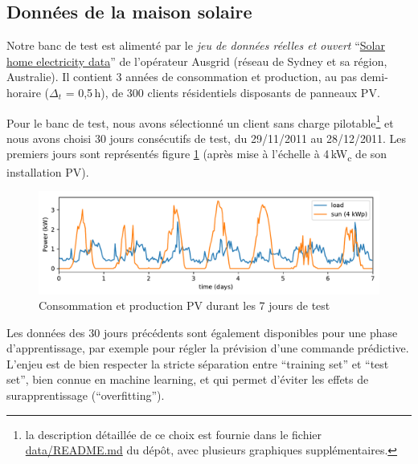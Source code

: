 \documentclass[a4paper,10pt,twocolumn]{article}
\newcommand\sub[1]{\textsubscript{#1}}
\begin{document}
\subsection{Données de la maison solaire}
\label{ss:sol_data}

Notre banc de test est alimenté par le \emph{jeu de données réelles et ouvert} ``\href{https://www.ausgrid.com.au/Common/About-us/Corporate-information/Data-to-share/Solar-home-electricity-data.aspx}{Solar home electricity data}''
de l'opérateur Ausgrid (réseau de Sydney et sa région, Australie).
Il contient 3 années de consommation et production, au pas demi-horaire ($\Delta_t$ = 0,5\,h),
de 300 clients résidentiels disposants de panneaux PV.

Pour le banc de test, nous avons sélectionné un client sans charge pilotable\footnote{
  la description détaillée de ce choix est fournie dans le fichier \href{https://github.com/pierre-haessig/solarhome-control-bench/blob/master/data/README.md}{data/README.md} du dépôt, avec plusieurs graphiques supplémentaires.}
et nous avons choisi 30 jours consécutifs de test, du 29/11/2011 au 28/12/2011.
Les premiers jours sont représentés figure \ref{fig:testdata}
(après mise à l'échelle à 4\,kW\sub{c} de son installation PV).

\begin{figure}[!ht]
        \begin{center}
                \includegraphics[width=1\columnwidth]{figures/data_week_2011-11-29.pdf}
        \end{center}

        \caption{Consommation et production PV durant les 7 jours de test
        }
        \label{fig:testdata}
\end{figure}

Les données des 30 jours précédents sont également disponibles pour une phase d'apprentissage,
par exemple pour régler la prévision d'une commande prédictive.
L'enjeu est de bien respecter la stricte séparation entre ``training set''
et ``test set'', bien connue en machine learning, et qui permet d'éviter les effets de surapprentissage
(``overfitting'').
\end{document}
